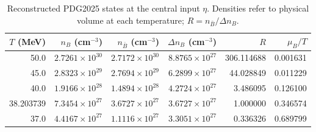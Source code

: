 \begin{table}[t]\centering\small
\caption{Reconstructed PDG2025 states at the central input $\eta$. Densities refer to physical volume at each temperature; $R=n_{\bar B}/\Delta n_B$.}
\label{tab:states}
\setlength{\tabcolsep}{6pt}
\begin{tabular}{rrrrrr}\toprule
$T$ (MeV) & $n_B$ (cm$^{-3}$) & $n_{\bar B}$ (cm$^{-3}$) & $\Delta n_B$ (cm$^{-3}$) & $R$ & $\mu_B/T$\\\midrule
50.0 & $2.7261\times10^{30}$ & $2.7172\times10^{30}$ & $8.8765\times10^{27}$ & 306.114688 & 0.001631\\
45.0 & $2.8323\times10^{29}$ & $2.7694\times10^{29}$ & $6.2899\times10^{27}$ & 44.028849 & 0.011229\\
40.0 & $1.9166\times10^{28}$ & $1.4894\times10^{28}$ & $4.2724\times10^{27}$ & 3.486095 & 0.126100\\
38.203739 & $7.3454\times10^{27}$ & $3.6727\times10^{27}$ & $3.6727\times10^{27}$ & 1.000000 & 0.346574\\
37.0 & $4.4167\times10^{27}$ & $1.1116\times10^{27}$ & $3.3051\times10^{27}$ & 0.336326 & 0.689799\\
\bottomrule\end{tabular}
\end{table}
